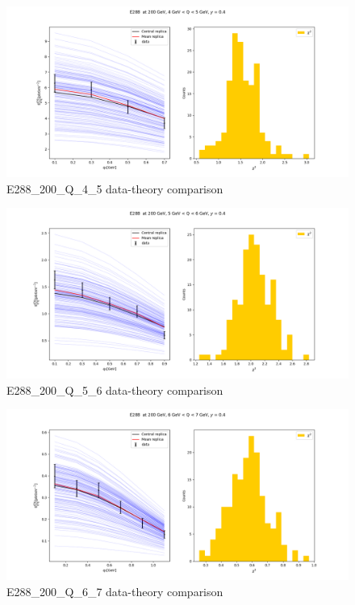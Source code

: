 \documentclass[
]{article}
\begin{document}
\begin{figure}
\centering
\includegraphics{pngplots/E288_200_Q_4_5.png}
\caption{E288\_200\_Q\_4\_5 data-theory comparison}
\end{figure}

\begin{figure}
\centering
\includegraphics{pngplots/E288_200_Q_5_6.png}
\caption{E288\_200\_Q\_5\_6 data-theory comparison}
\end{figure}

\begin{figure}
\centering
\includegraphics{pngplots/E288_200_Q_6_7.png}
\caption{E288\_200\_Q\_6\_7 data-theory comparison}
\end{figure}
\end{document}
